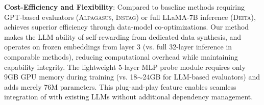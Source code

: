 \textbf{Cost-Efficiency and Flexibility}:
Compared to baseline methods requiring GPT-based evaluators (\textsc{Alpagasus}, \textsc{Instag}) or full LLaMA-7B inference (\textsc{Deita}), \ours achieves superior efficiency through data-model co-optimizations. Our method makes the LLM ability of self-rewarding from dedicated data synthesis, and operates on frozen embeddings from layer 3 (vs. full 32-layer inference in comparable methods), reducing computational overhead while maintaining capability integrity. 
The lightweight 5-layer MLP probe module requires only 9GB GPU memory during training (vs. 18$\sim$24GB for LLM-based evaluators) and adds merely 76M parameters. 
This plug-and-play feature enables seamless integration of \ours with existing LLMs without additional dependency management.
